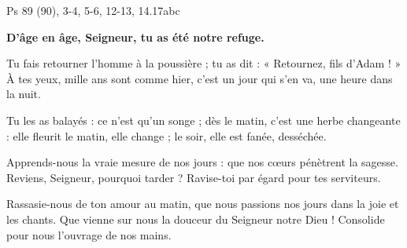 Ps 89 (90), 3-4, 5-6, 12-13, 14.17abc

\textbf{D’âge en âge, Seigneur, tu as été notre refuge.}

\smallskip

Tu fais retourner l’homme à la poussière ;
tu as dit : « Retournez, fils d’Adam ! »
À tes yeux, mille ans sont comme hier,
c’est un jour qui s’en va, une heure dans la nuit.

\smallskip

Tu les as balayés : ce n’est qu’un songe ;
dès le matin, c’est une herbe changeante :
elle fleurit le matin, elle change ;
le soir, elle est fanée, desséchée.

\smallskip

Apprends-nous la vraie mesure de nos jours :
que nos cœurs pénètrent la sagesse.
Reviens, Seigneur, pourquoi tarder ?
Ravise-toi par égard pour tes serviteurs.

\smallskip

Rassasie-nous de ton amour au matin,
que nous passions nos jours dans la joie et les chants.
Que vienne sur nous la douceur du Seigneur notre Dieu !
Consolide pour nous l’ouvrage de nos mains.

